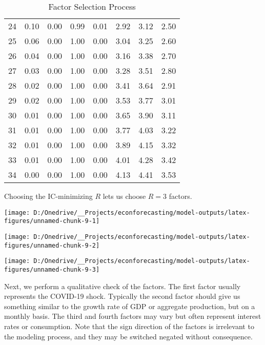 \documentclass[11pt, letterpaper]{article}\usepackage[]{graphicx}\usepackage[]{color}
\begin{document}
\begin{table}[H]
\begin{tabular}{cccccccc}
   24 & 0.10 & 0.00 & 0.99 & 0.01 & 2.92 & 3.12 & 2.50 \\ 
   25 & 0.06 & 0.00 & 1.00 & 0.00 & 3.04 & 3.25 & 2.60 \\ 
   26 & 0.04 & 0.00 & 1.00 & 0.00 & 3.16 & 3.38 & 2.70 \\ 
   27 & 0.03 & 0.00 & 1.00 & 0.00 & 3.28 & 3.51 & 2.80 \\ 
   28 & 0.02 & 0.00 & 1.00 & 0.00 & 3.41 & 3.64 & 2.91 \\ 
   29 & 0.02 & 0.00 & 1.00 & 0.00 & 3.53 & 3.77 & 3.01 \\ 
   30 & 0.01 & 0.00 & 1.00 & 0.00 & 3.65 & 3.90 & 3.11 \\ 
   31 & 0.01 & 0.00 & 1.00 & 0.00 & 3.77 & 4.03 & 3.22 \\ 
   32 & 0.01 & 0.00 & 1.00 & 0.00 & 3.89 & 4.15 & 3.32 \\ 
   33 & 0.01 & 0.00 & 1.00 & 0.00 & 4.01 & 4.28 & 3.42 \\ 
   34 & 0.00 & 0.00 & 1.00 & 0.00 & 4.13 & 4.41 & 3.53 \\ 
   \hline
\end{tabular}
\endgroup
\caption{Factor Selection Process} 
\end{table}


Choosing the IC-minimizing $R$ lets us choose $R = 3$ factors.



{\centering \texttt{[image: D:/Onedrive/\_\_Projects/econforecasting/model-outputs/latex-figures/unnamed-chunk-9-1]} 

}




{\centering \texttt{[image: D:/Onedrive/\_\_Projects/econforecasting/model-outputs/latex-figures/unnamed-chunk-9-2]} 

}




{\centering \texttt{[image: D:/Onedrive/\_\_Projects/econforecasting/model-outputs/latex-figures/unnamed-chunk-9-3]} 

}




Next, we perform a qualitative check of the factors. The first factor usually represents the COVID-19 shock. Typically the second factor should give us something similar to the growth rate of GDP or aggregate production, but on a monthly basis. The third and fourth factors may vary but often represent interest rates or consumption. Note that the sign direction of the factors is irrelevant to the modeling process, and they may be switched negated without consequence. 
\end{document}
